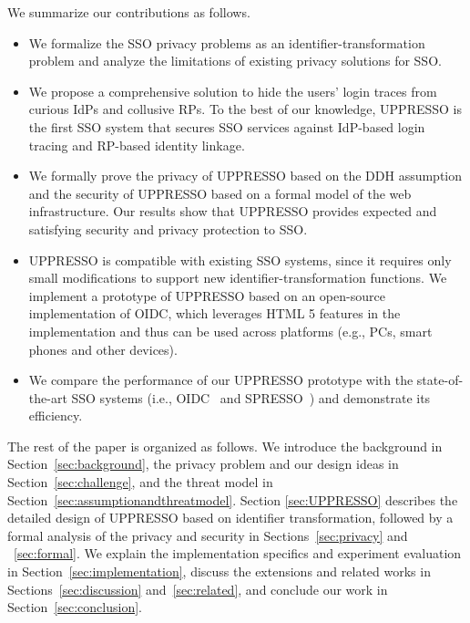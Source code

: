 We summarize our contributions as follows.
\begin{itemize}
\vspace{-\topsep}
\item We formalize the SSO privacy problems as an identifier-transformation problem and analyze the limitations of existing privacy solutions for SSO. 
\vspace{-\topsep}
\item We propose a comprehensive solution to hide the users' login traces from curious IdPs and collusive RPs. To the best of our knowledge, UPPRESSO is the first SSO system that secures SSO services against IdP-based login tracing and RP-based identity linkage.
\vspace{-\topsep}
\item We formally prove the privacy of UPPRESSO based on the DDH assumption and the security of UPPRESSO based on a formal model of the web infrastructure. Our results show that UPPRESSO provides expected and satisfying security and privacy protection to SSO.
\vspace{-\topsep}
\item UPPRESSO is compatible with existing SSO systems, since it requires only small modifications to support new identifier-transformation functions. We implement a prototype of UPPRESSO based on an open-source implementation of OIDC, which leverages HTML 5 features in the implementation and thus can be used across platforms (e.g., PCs, smart phones and other devices). %
\vspace{-\topsep}
\item We compare the performance of our UPPRESSO prototype with the state-of-the-art SSO systems (i.e., OIDC~\cite{OpenIDConnect} and SPRESSO~\cite{SPRESSO}) and demonstrate its efficiency.
\end{itemize}
\vspace{-\topsep}
The rest of the paper is organized as follows. We introduce the background in Section~\ref{sec:background}, the privacy problem and our design ideas in Section~\ref{sec:challenge}, and the threat model in Section~\ref{sec:assumptionandthreatmodel}. Section \ref{sec:UPPRESSO} describes the detailed design of UPPRESSO based on identifier transformation, followed by a formal analysis of the privacy and security in Sections~\ref{sec:privacy} and ~\ref{sec:formal}. We explain the implementation specifics and experiment evaluation in Section~\ref{sec:implementation}, discuss the extensions and related works in Sections~\ref{sec:discussion} and~\ref{sec:related}, and conclude our work in Section~\ref{sec:conclusion}.


